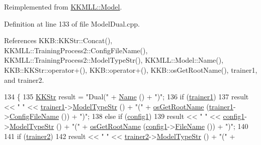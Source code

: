 Reimplemented from \hyperlink{class_k_k_m_l_l_1_1_model_a99f1cf513a3447ddc200fb8beb870c36}{K\+K\+M\+L\+L\+::\+Model}.



Definition at line 133 of file Model\+Dual.\+cpp.



References K\+K\+B\+::\+K\+K\+Str\+::\+Concat(), K\+K\+M\+L\+L\+::\+Training\+Process2\+::\+Config\+File\+Name(), K\+K\+M\+L\+L\+::\+Training\+Process2\+::\+Model\+Type\+Str(), K\+K\+M\+L\+L\+::\+Model\+::\+Name(), K\+K\+B\+::\+K\+K\+Str\+::operator+(), K\+K\+B\+::operator+(), K\+K\+B\+::os\+Get\+Root\+Name(), trainer1, and trainer2.


\begin{DoxyCode}
134 \{
135   \hyperlink{class_k_k_b_1_1_k_k_str}{KKStr}  result = \textcolor{stringliteral}{"Dual("} + \hyperlink{class_k_k_m_l_l_1_1_model_afe3e1b7d4066a438266320ec6efd43de}{Name} () + \textcolor{stringliteral}{")"};
136   \textcolor{keywordflow}{if}  (\hyperlink{class_k_k_m_l_l_1_1_model_dual_ac70e06e4290a0eca3cb79892170fdf6c}{trainer1})
137     result << \textcolor{stringliteral}{" "} << \hyperlink{class_k_k_m_l_l_1_1_model_dual_ac70e06e4290a0eca3cb79892170fdf6c}{trainer1}->\hyperlink{class_k_k_m_l_l_1_1_training_process2_a40ca6e4fcb08800ddb6895a106e7d896}{ModelTypeStr} () + \textcolor{stringliteral}{"("} + 
      \hyperlink{namespace_k_k_b_af5b668ed9902d7f93b62529664a739f0}{osGetRootName} (\hyperlink{class_k_k_m_l_l_1_1_model_dual_ac70e06e4290a0eca3cb79892170fdf6c}{trainer1}->\hyperlink{class_k_k_m_l_l_1_1_training_process2_a6692c410f62c041847697586b02ef6c4}{ConfigFileName} ()) + \textcolor{stringliteral}{")"};
138   \textcolor{keywordflow}{else} \textcolor{keywordflow}{if}  (\hyperlink{class_k_k_m_l_l_1_1_model_dual_a1d0f07c3ee783f1f91bcb5436c968908}{config1})
139     result << \textcolor{stringliteral}{" "} << \hyperlink{class_k_k_m_l_l_1_1_model_dual_a1d0f07c3ee783f1f91bcb5436c968908}{config1}->\hyperlink{class_k_k_m_l_l_1_1_training_configuration2_afbb93778d0a4c77cd319425705337b44}{ModelTypeStr}  () + \textcolor{stringliteral}{"("} + 
      \hyperlink{namespace_k_k_b_af5b668ed9902d7f93b62529664a739f0}{osGetRootName} (\hyperlink{class_k_k_m_l_l_1_1_model_dual_a1d0f07c3ee783f1f91bcb5436c968908}{config1}->\hyperlink{class_k_k_b_1_1_configuration_a257e3c439e437688bbdd0d8f1c96f55c}{FileName} ()) + \textcolor{stringliteral}{")"};
140 
141   \textcolor{keywordflow}{if}  (\hyperlink{class_k_k_m_l_l_1_1_model_dual_aed7b1f99f54b08770555fb1e9c5d4b21}{trainer2})
142     result << \textcolor{stringliteral}{" "} << \hyperlink{class_k_k_m_l_l_1_1_model_dual_aed7b1f99f54b08770555fb1e9c5d4b21}{trainer2}->\hyperlink{class_k_k_m_l_l_1_1_training_process2_a40ca6e4fcb08800ddb6895a106e7d896}{ModelTypeStr} () + \textcolor{stringliteral}{"("} + 

\end{DoxyCode}
